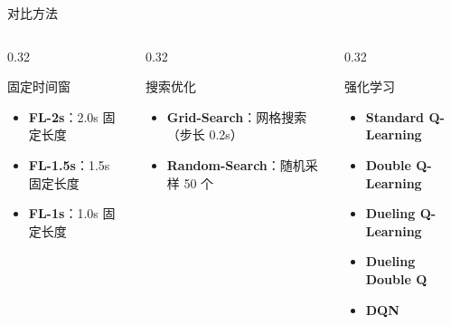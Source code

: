 \begin{frame}{对比方法}
    \begin{columns}[T]
        \begin{column}{0.32\textwidth}
            \begin{block}{\centering \normalsize 固定时间窗}
                \begin{itemize}
                    \item \textbf{FL-2s}：2.0s 固定长度
                    \item \textbf{FL-1.5s}：1.5s 固定长度
                    \item \textbf{FL-1s}：1.0s 固定长度
                \end{itemize}
            \end{block}
        \end{column}

        \begin{column}{0.32\textwidth}
            \begin{block}{\centering \normalsize 搜索优化}
                \begin{itemize}
                    \item \textbf{Grid-Search}：网格搜索（步长 0.2s）
                    \item \textbf{Random-Search}：随机采样 50 个
                \end{itemize}
            \end{block}
        \end{column}

        \begin{column}{0.32\textwidth}
            \begin{block}{\centering \normalsize 强化学习}
                \begin{itemize}
                    \item \textbf{Standard Q-Learning}
                    \item \textbf{Double Q-Learning}
                    \item \textbf{Dueling Q-Learning}
                    \item \textbf{Dueling Double Q}
                    \item \textbf{DQN}
                \end{itemize}
            \end{block}
        \end{column}
    \end{columns}


\end{frame}

